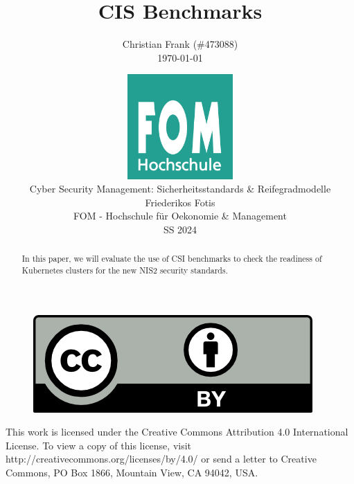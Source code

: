 \documentclass[12pt,a4paper,listof=totoc,bibliography=totoc]{scrartcl}
\newcommand\svthema{CIS Benchmarks}
\newcommand\svperson{Christian Frank (\#473088)}
\newcommand\svdatum{\today}
\newcommand\lvname{Cyber Security Management: Sicherheitsstandards \& Reifegradmodelle}
\newcommand\lvtyp{SS 2024}
\newcommand\lvinst{FOM - Hochschule für Oekonomie \& Management}
\newcommand\lvbetr{Friederikos Fotis}
\begin{document}
\title{ \huge\textbf{\svthema} }
\author{ {\svperson} \\ \svdatum }
\date{ \normalsize \centering \includegraphics[width=0.3\textwidth]{FOM}\\ {\lvname} \\ {\lvbetr} \\ {\lvinst} \\ {\lvtyp} }

\pagestyle{fancy}
\fancyhf{}
\fancyhf[ch]{\thepage}
\renewcommand\headrulewidth{0pt}

\maketitle
\thispagestyle{empty} %

\begin{abstract}
In this paper, we will evaluate the use of CSI benchmarks to check the readiness of Kubernetes clusters for the new NIS2 security standards.

\end{abstract}

\vfill
\begin{figure}[h]
    \centering
    \includegraphics[]{CC-BY}
\end{figure}

This work is licensed under the Creative Commons Attribution 4.0 International License. To view a copy of this license, visit http://creativecommons.org/licenses/by/4.0/ or send a letter to Creative Commons, PO Box 1866, Mountain View, CA 94042, USA.

\cleardoublepage
\end{document}

